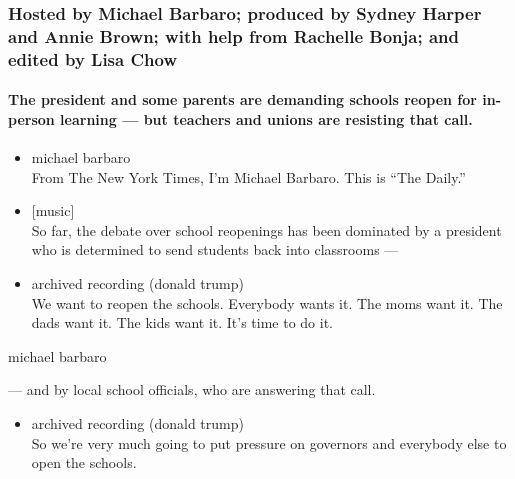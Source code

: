 \hypertarget{hosted-by-michael-barbaro-produced-by-sydney-harper-and-annie-brown-with-help-from-rachelle-bonja-and-edited-by-lisa-chow}{%
\subsubsection{Hosted by Michael Barbaro; produced by Sydney Harper and
Annie Brown; with help from Rachelle Bonja; and edited by Lisa
Chow}\label{hosted-by-michael-barbaro-produced-by-sydney-harper-and-annie-brown-with-help-from-rachelle-bonja-and-edited-by-lisa-chow}}

\hypertarget{the-president-and-some-parents-are-demanding-schools-reopen-for-in-person-learning--but-teachers-and-unions-are-resisting-that-call}{%
\paragraph{The president and some parents are demanding schools reopen
for in-person learning --- but teachers and unions are resisting that
call.}\label{the-president-and-some-parents-are-demanding-schools-reopen-for-in-person-learning--but-teachers-and-unions-are-resisting-that-call}}

\begin{itemize}
\item
  michael barbaro\\
  From The New York Times, I'm Michael Barbaro. This is ``The Daily.''
\item
  {[}music{]}\\
  So far, the debate over school reopenings has been dominated by a
  president who is determined to send students back into classrooms ---
\item
  archived recording (donald trump)\\
  We want to reopen the schools. Everybody wants it. The moms want it.
  The dads want it. The kids want it. It's time to do it.
\end{itemize}

michael barbaro

--- and by local school officials, who are answering that call.

\begin{itemize}
\tightlist
\item
  archived recording (donald trump)\\
  So we're very much going to put pressure on governors and everybody
  else to open the schools.
\end{itemize}

